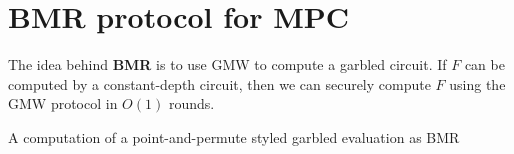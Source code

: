 \section{BMR protocol for MPC}

\begin{prcl}
The idea behind \textbf{BMR} is to use GMW to compute a garbled circuit.
If $F$ can be computed by a constant-depth circuit, then we can securely compute $F$ using the GMW protocol in $O(1)$ rounds.

\end{prcl}

\begin{expl}
A computation of a point-and-permute styled garbled evaluation as BMR
\end{expl}

